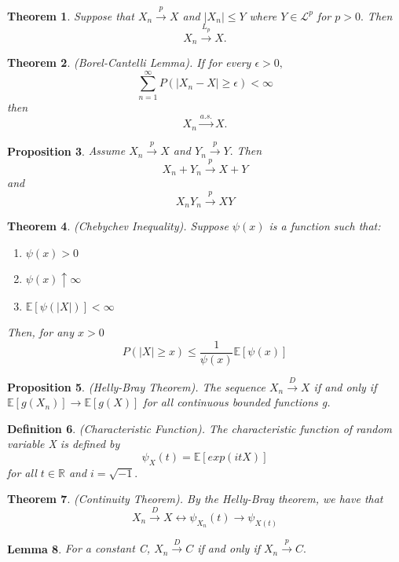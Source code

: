 \documentclass[twoside]{article}
\newcounter{lecnum}
\newtheorem{theorem}{Theorem}[lecnum]
\newtheorem{lemma}[theorem]{Lemma}
\newtheorem{proposition}[theorem]{Proposition}
\newtheorem{definition}[theorem]{Definition}
\begin{document}
\begin{theorem} Suppose that $X_n \xrightarrow{p} X$ and $|X_n| \leq Y$ where $Y \in \mathcal{L}^p$ for $p > 0.$ Then 
$$
X_n \xrightarrow{L_{p}} X.
$$
\end{theorem}


\begin{theorem}(Borel-Cantelli Lemma). If for every $\epsilon > 0,$
$$
\sum_{n=1}^{\infty}P(|X_n - X| \geq \epsilon ) < \infty
$$
then 
$$
X_n \xrightarrow{a.s.} X.
$$
\end{theorem}


\begin{proposition}
Assume $X_n \xrightarrow{p} X$ and $Y_n \xrightarrow{p} Y.$ Then 
$$
X_n + Y_n \xrightarrow{p} X + Y
$$
and 
$$
X_nY_n \xrightarrow{p} XY
$$
\end{proposition}


\begin{theorem}(Chebychev Inequality). Suppose $\psi(x)$ is a function such that:
\begin{enumerate}
\item $\psi(x) > 0$ 
\item $\psi(x) \uparrow \infty$
\item $\mathbb{E}[\psi(|X|)] < \infty$
\end{enumerate}
Then, for any $x > 0$
$$
P(|X| \geq x) \leq \frac{1}{\psi(x)}\mathbb{E}[\psi(x)]
$$
\end{theorem}






\begin{proposition}(Helly-Bray Theorem). The sequence $X_n \xrightarrow{D} X$ if and only if $\mathbb{E}[g(X_n)] \rightarrow \mathbb{E}[g(X)]$ for all continuous bounded functions g.
\end{proposition}

\begin{definition}(Characteristic Function). The characteristic function of random variable X is defined by 
$$
\psi_X(t) = \mathbb{E}[exp(itX)]
$$
for all $t \in \mathbb{R}$ and $i = \sqrt{-1}.$
\end{definition}

\begin{theorem}(Continuity Theorem). 
By the Helly-Bray theorem, we have that 
$$
X_n \xrightarrow{D} X \leftrightarrow \psi_{X_{n}}(t) \rightarrow \psi_{X(t)}
$$
\end{theorem}

\begin{lemma} For a constant C, $X_n \xrightarrow{D} C$ if and only if $X_n \xrightarrow{p} C.$
\end{lemma}
\end{document}

